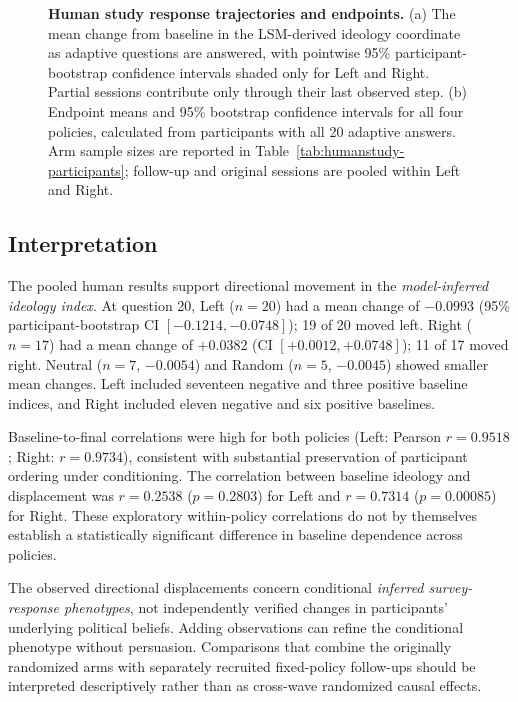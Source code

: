\begin{figure}[!ht]
\centering
{}
\tikzexternalenable



\vspace{-10pt}
\caption{\textbf{Human study response trajectories and endpoints.}
(a) The mean change from baseline in the LSM-derived ideology coordinate as
adaptive questions are answered, with pointwise 95\% participant-bootstrap
confidence intervals shaded only for Left and Right. Partial sessions contribute
only through their last observed step. (b) Endpoint means and 95\% bootstrap
confidence intervals for all four policies, calculated from participants with
all 20 adaptive answers. Arm sample sizes are reported in
Table~\ref{tab:humanstudy-participants}; follow-up and original
sessions are pooled within Left and Right.}
\label{fig:humanstudy-trajectory-endpoints}


\end{figure}



\subsection{Interpretation}
The pooled human results support directional movement in the
\emph{model-inferred ideology index}. At question 20, Left ($n=20$)
had a mean change of $-0.0993$ (95\% participant-bootstrap CI
$[-0.1214,-0.0748]$); 19 of 20 moved left. Right ($n=17$)
had a mean change of $+0.0382$ (CI $[+0.0012,+0.0748]$);
11 of 17 moved right. Neutral ($n=7$, $-0.0054$) and
Random ($n=5$, $-0.0045$) showed smaller mean changes.
Left included seventeen negative and three positive baseline
indices, and Right included eleven negative and six positive baselines.

Baseline-to-final correlations were high for both policies
(Left: Pearson $r=0.9518$; Right: $r=0.9734$), consistent with
substantial preservation of participant ordering under conditioning.
The correlation between baseline ideology and displacement was
$r=0.2538$ ($p=0.2803$) for Left and $r=0.7314$
($p=0.00085$) for Right. These exploratory within-policy
correlations do not by themselves establish a statistically
significant difference in baseline dependence across policies.

The observed directional displacements concern conditional
\emph{inferred survey-response phenotypes}, not independently
verified changes in participants' underlying political beliefs.
Adding observations can refine the conditional phenotype without
persuasion. Comparisons that combine the originally randomized
arms with separately recruited fixed-policy follow-ups should be
interpreted descriptively rather than as cross-wave randomized
causal effects.
